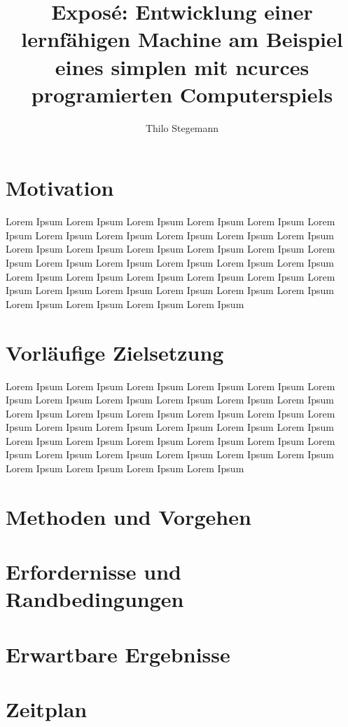 \documentclass[12pt,a4paper]{article}
\author{Thilo Stegemann}
\title{Exposé: Entwicklung einer lernfähigen Machine am Beispiel eines simplen mit ncurces programierten Computerspiels}
\begin{document}
\maketitle

\section*{Motivation}
Lorem Ipsum Lorem Ipsum Lorem Ipsum Lorem Ipsum Lorem Ipsum Lorem Ipsum Lorem Ipsum Lorem Ipsum Lorem Ipsum Lorem Ipsum Lorem Ipsum Lorem Ipsum Lorem Ipsum Lorem Ipsum Lorem Ipsum Lorem Ipsum Lorem Ipsum Lorem Ipsum Lorem Ipsum Lorem Ipsum Lorem Ipsum Lorem Ipsum Lorem Ipsum Lorem Ipsum Lorem Ipsum Lorem Ipsum Lorem Ipsum Lorem Ipsum Lorem Ipsum Lorem Ipsum Lorem Ipsum Lorem Ipsum Lorem Ipsum Lorem Ipsum Lorem Ipsum Lorem Ipsum Lorem Ipsum

\section*{Vorläufige Zielsetzung}
Lorem Ipsum Lorem Ipsum Lorem Ipsum Lorem Ipsum Lorem Ipsum Lorem Ipsum Lorem Ipsum Lorem Ipsum Lorem Ipsum Lorem Ipsum Lorem Ipsum Lorem Ipsum Lorem Ipsum Lorem Ipsum Lorem Ipsum Lorem Ipsum Lorem Ipsum Lorem Ipsum Lorem Ipsum Lorem Ipsum Lorem Ipsum Lorem Ipsum Lorem Ipsum Lorem Ipsum Lorem Ipsum Lorem Ipsum Lorem Ipsum Lorem Ipsum Lorem Ipsum Lorem Ipsum Lorem Ipsum Lorem Ipsum Lorem Ipsum Lorem Ipsum Lorem Ipsum Lorem Ipsum Lorem Ipsum

\section*{Methoden und Vorgehen}

\section*{Erfordernisse und Randbedingungen}

\section*{Erwartbare Ergebnisse}

\section*{Zeitplan}
\end{document}
